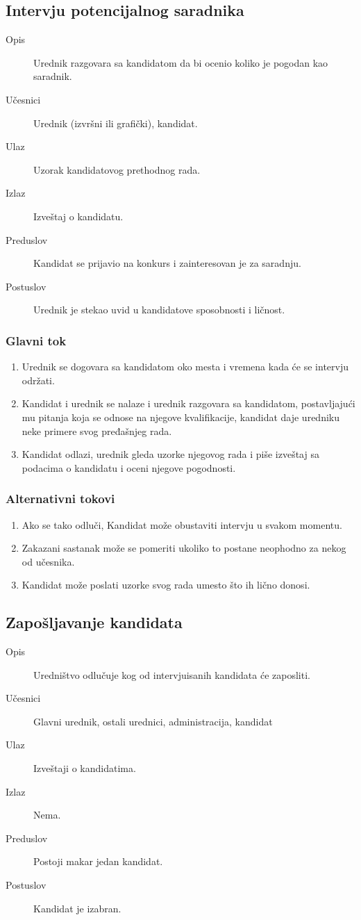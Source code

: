 \subsection{Intervju potencijalnog saradnika}
\begin{description}
\item [Opis] Urednik razgovara sa kandidatom da bi ocenio koliko je pogodan kao saradnik.
\item [Učesnici] Urednik (izvršni ili grafički), kandidat.
\item [Ulaz] Uzorak kandidatovog prethodnog rada.
\item [Izlaz] Izveštaj o kandidatu.
\item [Preduslov] Kandidat se prijavio na konkurs i zainteresovan je za saradnju.
\item [Postuslov] Urednik je stekao uvid u kandidatove sposobnosti i ličnost.
\end{description}
\subsubsection{Glavni tok}
\begin{enumerate} 
\item Urednik se dogovara sa kandidatom oko mesta i vremena kada će se intervju održati.
\item Kandidat i urednik se nalaze i urednik razgovara sa kandidatom, postavljajući mu pitanja koja se odnose na njegove kvalifikacije, kandidat daje uredniku neke primere svog pređašnjeg rada.
\item Kandidat odlazi, urednik gleda uzorke njegovog rada i piše izveštaj sa podacima o kandidatu i oceni njegove pogodnosti.
\end{enumerate}
\subsubsection{Alternativni tokovi}
\begin{enumerate} 
\item Ako se tako odluči, Kandidat može obustaviti intervju u svakom momentu.
\item Zakazani sastanak može se pomeriti ukoliko to postane neophodno za nekog od učesnika.
\item Kandidat može poslati uzorke svog rada umesto što ih lično donosi.
\end{enumerate}

\subsection{Zapošljavanje kandidata}
\begin{description}
\item [Opis] Uredništvo odlučuje kog od intervjuisanih kandidata će zaposliti.
\item [Učesnici] Glavni urednik, ostali urednici, administracija, kandidat
\item [Ulaz] Izveštaji o kandidatima.
\item [Izlaz] Nema.
\item [Preduslov] Postoji makar jedan kandidat.
\item [Postuslov] Kandidat je izabran.
\end{description}
